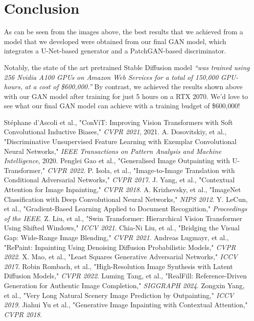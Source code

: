 \documentclass[sigconf]{acmart}
\begin{document}
\section*{Conclusion}

As can be seen from the images above, the best results that we achieved from a model that we developed were obtained from our final GAN model, which integrates a U-Net-based generator and a PatchGAN-based discriminator.

Notably, the state of the art pretrained Stable Diffusion model \textit{“was trained using 256 Nvidia A100 GPUs on Amazon Web Services for a total of 150,000 GPU-hours, at a cost of \$600,000.”} By contrast, we achieved the results shown above with our GAN model after training for just 5 hours on a RTX 2070. We’d love to see what our final GAN model can achieve with a training budget of \$600,000!

\begin{thebibliography}{9}
     Stéphane d’Ascoli et al., "ConViT: Improving Vision Transformers with Soft Convolutional Inductive Biases," \textit{CVPR 2021}, 2021.
     A. Dosovitskiy, et al., "Discriminative Unsupervised Feature Learning with Exemplar Convolutional Neural Networks," \textit{IEEE Transactions on Pattern Analysis and Machine Intelligence}, 2020.
     Penglei Gao et al., "Generalised Image Outpainting with U-Transformer," \textit{CVPR 2022}.
     P. Isola, et al., "Image-to-Image Translation with Conditional Adversarial Networks," \textit{CVPR 2017}.
     J. Yang, et al., "Contextual Attention for Image Inpainting," \textit{CVPR 2018}.
     A. Krizhevsky, et al., "ImageNet Classification with Deep Convolutional Neural Networks," \textit{NIPS 2012}.
     Y. LeCun, et al., "Gradient-Based Learning Applied to Document Recognition," \textit{Proceedings of the IEEE}.
     Z. Liu, et al., "Swin Transformer: Hierarchical Vision Transformer Using Shifted Windows," \textit{ICCV 2021}.
     Chia-Ni Liu, et al., "Bridging the Visual Gap: Wide-Range Image Blending," \textit{CVPR 2021}.
     Andreas Lugmayr, et al., "RePaint: Inpainting Using Denoising Diffusion Probabilistic Models," \textit{CVPR 2022}.
     X. Mao, et al., "Least Squares Generative Adversarial Networks," \textit{ICCV 2017}.
     Robin Rombach, et al., "High-Resolution Image Synthesis with Latent Diffusion Models," \textit{CVPR 2022}.
     Luming Tang, et al., "RealFill: Reference-Driven Generation for Authentic Image Completion," \textit{SIGGRAPH 2024}.
     Zongxin Yang, et al., "Very Long Natural Scenery Image Prediction by Outpainting," \textit{ICCV 2019}.
     Jiahui Yu et al., "Generative Image Inpainting with Contextual Attention," \textit{CVPR 2018}.
\end{thebibliography}
\end{document}
